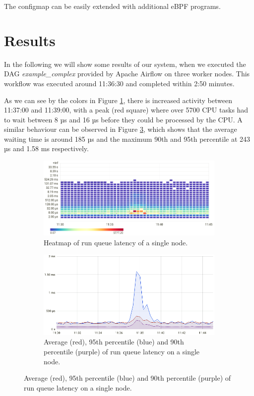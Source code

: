 \documentclass[a4paper,journal]{IEEEtran}
\begin{document}
The configmap can be easily extended with additional eBPF programs.


\section{Results}
\label{sec:results}
In the following we will show some results of our system, when we executed the DAG \textit{example\_complex } \cite{exampleComplex} provided by Apache Airflow on three worker nodes. This workflow was executed around 11:36:30 and completed within 2:50 minutes.

As we can see by the colors in Figure \ref{fig:results:runqlat:a}, there is increased activity between 11:37:00 and 11:39:00, with a peak (red square) where over 5700 CPU tasks had to wait between 8 µs and 16 µs before they could be processed by the CPU.
A similar behaviour can be observed in Figure \ref{fig:results:runqlat:b}, which shows that the average waiting time is around 185 µs and the maximum 90th and 95th percentile at 243 µs and 1.58 ms respectively.
\begin{figure}[h]
    \begin{subfigure}
        \centering
        \includegraphics[width=\linewidth]{images/results_runqlat_latency.png}
        \caption{Heatmap of run queue latency of a single node.}
        \label{fig:results:runqlat:a}
    \end{subfigure}
    \hfill
    \begin{subfigure}
        \centering
        \includegraphics[width=\linewidth]{images/results_runqlat_percentile.png}
        \caption{Average (red), 95th percentile (blue) and 90th percentile (purple) of run queue latency on a single node.}
        \label{fig:results:runqlat:b}
    \end{subfigure}
\end{figure}
\end{document}

